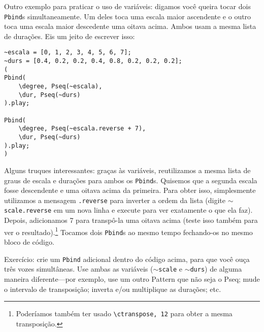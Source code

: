 Outro exemplo para praticar o uso de variáveis: digamos você queira tocar dois \texttt{Pbind}s simultaneamente. Um deles toca uma escala maior ascendente e o outro toca uma escala maior descedente uma oitava acima. Ambos usam a mesma lista de durações. Eis um jeito de escrever isso:

\begin{lstlisting}[style=SuperCollider-IDE, basicstyle=\scttfamily\footnotesize]
~escala = [0, 1, 2, 3, 4, 5, 6, 7];
~durs = [0.4, 0.2, 0.2, 0.4, 0.8, 0.2, 0.2, 0.2];
(
Pbind(
	\degree, Pseq(~escala),
	\dur, Pseq(~durs)
).play;

Pbind(
	\degree, Pseq(~escala.reverse + 7),
	\dur, Pseq(~durs)
).play;
)
\end{lstlisting}
 
Alguns truques interessantes: graças às variáveis, reutilizamos a mesma lista de graus de escala e durações para ambos os \texttt{Pbind}s. Quisemos que a segunda escala fosse descendente e uma oitava acima da primeira. Para obter isso, simplesmente utilizamos a mensagem \texttt{.reverse} para inverter a ordem da lista (digite \texttt{$\sim$scale.reverse} em um nova linha e execute para ver exatamente o que ela faz). Depois, adicionamos 7 para transpô-la uma oitava acima (teste isso também para ver o resultado).\footnote{Poderíamos também ter usado \texttt{\textbackslash ctranspose, 12} para obter a mesma transposição.} Tocamos dois \texttt{Pbind}s ao mesmo tempo fechando-os no mesmo bloco de código.

Exercício: crie um \texttt{Pbind} adicional dentro do código acima, para que você ouça três vozes simultâneas. Use ambas as variáveis (\texttt{$\sim$scale} e \texttt{$\sim$durs}) de alguma maneira diferente---por exemplo, use um outro Pattern que não seja o Pseq; mude o intervalo de transposição; inverta e/ou multiplique as durações; etc.
